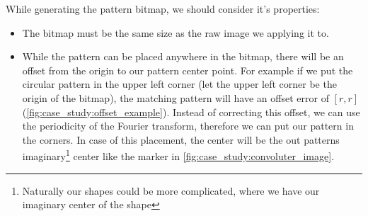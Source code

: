 While generating the pattern bitmap, we should consider it's properties:
\begin{itemize}
	\item The bitmap must be the same size as the raw image we applying it to.
	\item While the pattern can be placed anywhere in the bitmap, there will be an offset from the origin to our pattern center point. For example if we put the circular pattern in the upper left corner (let the upper left corner be the origin of the bitmap), the matching pattern will have an offset error of $[r, r]$ (\cref{fig:case_study:offset_example}). Instead of correcting this offset, we can use the periodicity of the Fourier transform, therefore we can put our pattern in the corners. In case of this placement, the center will be the out patterns imaginary\footnote{Naturally our shapes could be more complicated, where we have our imaginary center of the shape} center like the marker in \cref{fig:case_study:convoluter_image}.
\end{itemize}

